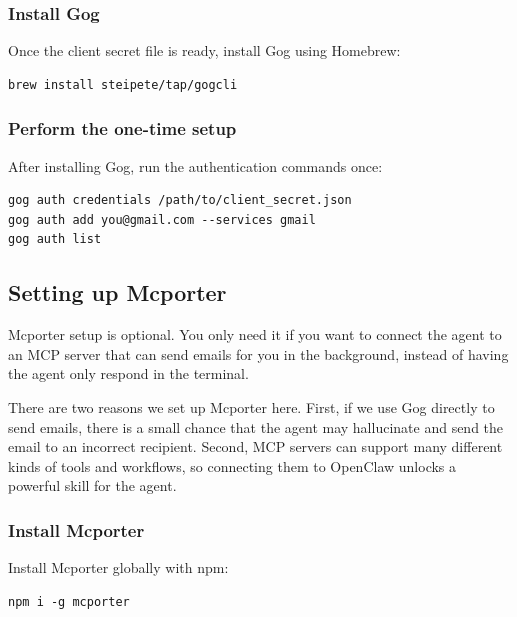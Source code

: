 \documentclass[12pt, a4paper]{article}
\begin{document}
\subsubsection{Install Gog}

Once the client secret file is ready, install Gog using Homebrew:

\begin{lstlisting}[style=shellstyle]
brew install steipete/tap/gogcli
\end{lstlisting}

\subsubsection{Perform the one-time setup}

After installing Gog, run the authentication commands once:

\begin{lstlisting}[style=shellstyle]
gog auth credentials /path/to/client_secret.json
gog auth add you@gmail.com --services gmail
gog auth list
\end{lstlisting}

\subsection{Setting up Mcporter}

Mcporter setup is optional. You only need it if you want to connect the agent to an MCP server that can send emails for you in the background, instead of having the agent only respond in the terminal.

\begin{notebox}
There are two reasons we set up Mcporter here. First, if we use Gog directly to send emails, there is a small chance that the agent may hallucinate and send the email to an incorrect recipient. Second, MCP servers can support many different kinds of tools and workflows, so connecting them to OpenClaw unlocks a powerful skill for the agent.
\end{notebox}

\subsubsection{Install Mcporter}

Install Mcporter globally with npm:

\begin{lstlisting}[style=shellstyle]
npm i -g mcporter
\end{lstlisting}
\end{document}

